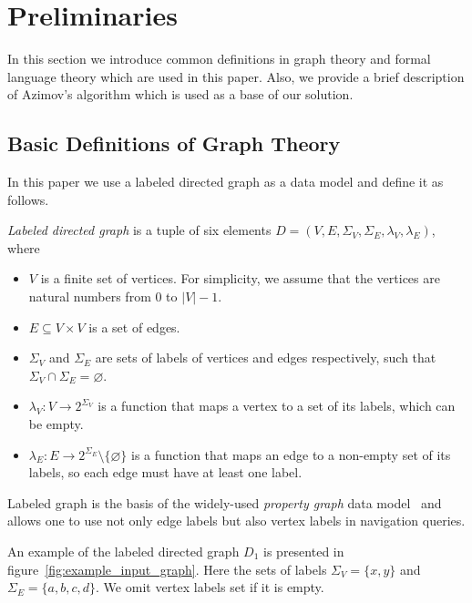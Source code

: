 \section{Preliminaries}

In this section we introduce common definitions in graph theory and formal language theory which are used in this paper.
Also, we provide a brief description of Azimov's algorithm which is used as a base of our solution.

\subsection{Basic Definitions of Graph Theory}

In this paper we use a labeled directed graph as a data model and define it as follows.
\begin{definition} \emph{Labeled directed graph} is a tuple of six elements $D = (V, E, \Sigma_V, \Sigma_E, \lambda_V, \lambda_E)$, where
\begin{itemize}
    \item $V$ is a finite set of vertices. For simplicity, we assume that the vertices are natural numbers from $0$ to $|V|-1$.
    \item $E \subseteq V \times V$ is a set of edges.
    \item $\Sigma_V$ and $\Sigma_E$ are sets of labels of vertices and edges respectively, such that $\Sigma_V \cap \Sigma_E = \varnothing$.
    \item $\lambda_V : V \xrightarrow{} 2^{\Sigma_V}$ is a function that maps a vertex to a set of its labels, which can be empty.
    \item $\lambda_E : E \xrightarrow{} 2^{\Sigma_E} \setminus \{\varnothing\}$ is a function that maps an edge to a non-empty set of its labels, so each edge must have at least one label.
\end{itemize} 
\end{definition}

Labeled graph is the basis of the widely-used \textit{property graph} data model~\cite{Angles2018ThePG} and allows one to use not only edge labels but also vertex labels in navigation queries.

An example of the labeled directed graph $D_1$ is presented in figure~\ref{fig:example_input_graph}. Here the sets of labels $\Sigma_V = \{x, y\}$ and $\Sigma_E = \{a, b, c, d\}$.
We omit vertex labels set if it is empty.


